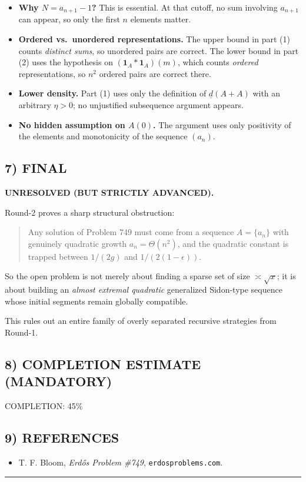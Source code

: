 \begin{itemize}
\item \textbf{Why $N=a_{n+1}-1$?} This is essential. At that cutoff, no sum involving $a_{n+1}$ can appear, so only the first $n$ elements matter.
\item \textbf{Ordered vs.\ unordered representations.} The upper bound in part (1) counts \emph{distinct sums}, so unordered pairs are correct. The lower bound in part (2) uses the hypothesis on $(\mathbf 1_A\ast \mathbf 1_A)(m)$, which counts \emph{ordered} representations, so $n^2$ ordered pairs are correct there.
\item \textbf{Lower density.} Part (1) uses only the definition of $\underline d(A+A)$ with an arbitrary $\eta>0$; no unjustified subsequence argument appears.
\item \textbf{No hidden assumption on $A(0)$.} The argument uses only positivity of the elements and monotonicity of the sequence $(a_n)$.
\end{itemize}

\subsection*{7) FINAL}

\noindent
\textbf{UNRESOLVED (BUT STRICTLY ADVANCED).}

Round-2 proves a sharp structural obstruction:
\begin{quote}
Any solution of Problem 749 must come from a sequence $A=\{a_n\}$ with genuinely quadratic growth $a_n=\Theta(n^2)$, and the quadratic constant is trapped between $1/(2g)$ and $1/(2(1-\epsilon))$.
\end{quote}
So the open problem is not merely about finding a sparse set of size $\asymp \sqrt{x}$; it is about building an \emph{almost extremal quadratic} generalized Sidon-type sequence whose initial segments remain globally compatible.

This rules out an entire family of overly separated recursive strategies from Round-1.

\subsection*{8) COMPLETION ESTIMATE (MANDATORY)}

COMPLETION: 45\%

\subsection*{9) REFERENCES}

\begin{itemize}
\item T. F. Bloom, \emph{Erd\H{o}s Problem \#749}, \texttt{erdosproblems.com}.
\end{itemize}

\bigskip
\hrule
\bigskip


